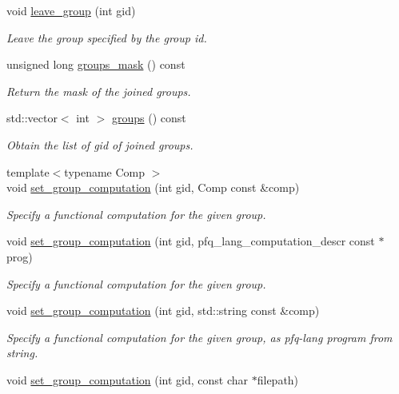 \begin{DoxyCompactItemize}
void \hyperlink{classpfq_1_1socket_ac512d6b89db52da73a51ba9112658180}{leave\+\_\+group} (int gid)
\begin{DoxyCompactList}\small\item\em Leave the group specified by the group id. \end{DoxyCompactList}\item 
unsigned long \hyperlink{classpfq_1_1socket_a136c71dc2292218fe43246770cf109da}{groups\+\_\+mask} () const
\begin{DoxyCompactList}\small\item\em Return the mask of the joined groups. \end{DoxyCompactList}\item 
std\+::vector$<$ int $>$ \hyperlink{classpfq_1_1socket_a6b850a0f5acec17e153c16cdfca16d52}{groups} () const
\begin{DoxyCompactList}\small\item\em Obtain the list of gid of joined groups. \end{DoxyCompactList}\item 
{\footnotesize template$<$typename Comp $>$ }\\void \hyperlink{classpfq_1_1socket_a5cb37765ffcb1b78c5d61211f9e806df}{set\+\_\+group\+\_\+computation} (int gid, Comp const \&comp)
\begin{DoxyCompactList}\small\item\em Specify a functional computation for the given group. \end{DoxyCompactList}\item 
void \hyperlink{classpfq_1_1socket_a5f0ff8e78f374974ae32753c313e931c}{set\+\_\+group\+\_\+computation} (int gid, pfq\+\_\+lang\+\_\+computation\+\_\+descr const $\ast$prog)
\begin{DoxyCompactList}\small\item\em Specify a functional computation for the given group. \end{DoxyCompactList}\item 
void \hyperlink{classpfq_1_1socket_aa326867f9a3ca1391158161ff54d564c}{set\+\_\+group\+\_\+computation} (int gid, std\+::string const \&comp)
\begin{DoxyCompactList}\small\item\em Specify a functional computation for the given group, as pfq-\/lang program from string. \end{DoxyCompactList}\item 
void \hyperlink{classpfq_1_1socket_acb1eaaaadbcbbee8b5f2054b01e51fda}{set\+\_\+group\+\_\+computation} (int gid, const char $\ast$filepath)

\end{DoxyCompactItemize}
